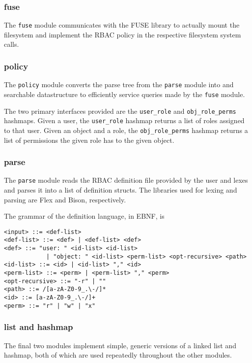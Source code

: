 \documentclass[11pt,oneside,letterpaper]{article}
\begin{document}
\subsubsection{fuse}

The {\tt fuse} module communicates with the FUSE library to actually mount
the filesystem and implement the RBAC policy in the respective filesystem
system calls.

\subsubsection{policy}

The {\tt policy} module converts the parse tree from the {\tt parse} module
into and searchable datastructure to efficiently service queries made by the
{\tt fuse} module.

The two primary interfaces provided are the {\tt user\_role} and {\tt obj\_role\_perms} hashmaps. Given a user, the {\tt user\_role} hashmap
returns a list of roles assigned to that user. Given an object and a role,
the {\tt obj\_role\_perms} hashmap returns a list of permissions the given
role has to the given object.

\subsubsection{parse}

The {\tt parse} module reads the RBAC definition file provided by the user
and lexes and parses it into a list of definition structs. The libraries
used for lexing and parsing are Flex and Bison, respectively.

The grammar of the definition language, in EBNF, is

\begin{lstlisting}
<input> ::= <def-list>
<def-list> ::= <def> | <def-list> <def>
<def> ::= "user: " <id-list> <id-list>
            | "object: " <id-list> <perm-list> <opt-recursive> <path>
<id-list> ::= <id> | <id-list> "," <id>
<perm-list> ::= <perm> | <perm-list> "," <perm>
<opt-recursive> ::= "-r" | ""
<path> ::= /[a-zA-Z0-9_.\-/]*
<id> ::= [a-zA-Z0-9_.\-/]+
<perm> ::= "r" | "w" | "x"
\end{lstlisting}

\subsubsection{list and hashmap}

The final two modules implement simple, generic versions of a linked
list and hashmap, both of which are used repeatedly throughout the
other modules.
\end{document}
